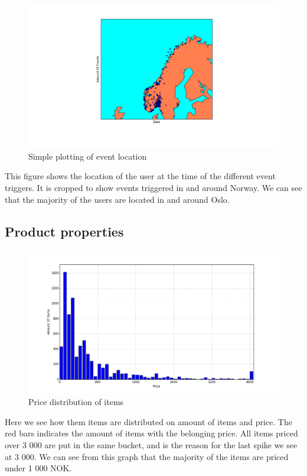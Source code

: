     \begin{figure}[H]
        \includegraphics[width=5in]{image/simpleGeoPlot.png}
        \centering
        \caption{Simple plotting of event location}
    \label{figure:croppedGeoplot}
    \end{figure}
        This figure shows the location of the user at the time of the different event triggers.
        It is cropped to show events triggered in and around Norway.
        We can see that the majority of the users are located in and around Oslo.

\subsection{Product properties}
    \begin{figure}[H]
        \includegraphics[width=5in]{image/priceDistribution.png}
        \centering
        \caption{Price distribution of items}
    \label{figure:priceDistribution}
    \end{figure}
        Here we see how them items are distributed on amount of items and price. The red bars indicates the amount of items with the belonging price.
        All items priced over 3 000 are put in the same bucket, and is the reason for the last spike we see at 3 000.
        We can see from this graph that the majority of the items are priced under 1 000 NOK.

